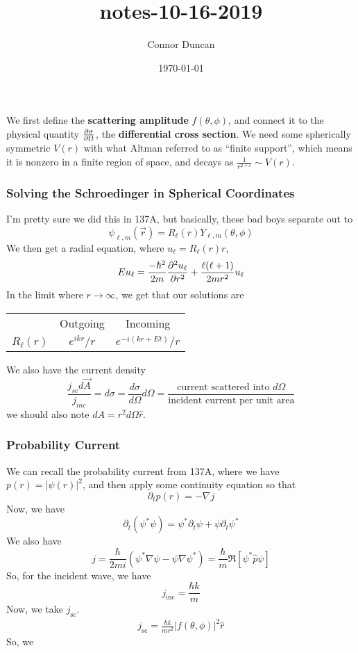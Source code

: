 \documentclass{article}
\author{Connor Duncan}
\date{\today}
\title{notes-10-16-2019}
\theoremstyle{definition}
\begin{document}
We first define the \textbf{scattering amplitude} $f(\theta,\phi)$, and connect it to the physical quantity $\pdv{\sigma}{\Omega}$, the \textbf{differential cross section}. We need some spherically symmetric $V(r)$ with what Altman referred to as ``finite support'', which means it is nonzero in a finite region of space, and decays as $\frac{1}{r^{2+\varepsilon}}\sim V(r)$. \subsubsection{Solving the Schroedinger in Spherical Coordinates} I'm pretty sure we did this in 137A, but basically, these bad boys separate out to \begin{equation} \psi_{\ell,m}(\vec{r})=R_{\ell}(r)Y_{\ell,m}(\theta,\phi) \end{equation} We then get a radial equation, where $u_\ell=R_\ell(r)r$, \begin{equation} Eu_\ell=\frac{-\hbar^2}{2m}\pdv[2]{u_\ell}{r}+\frac{\ell(\ell+1)}{2mr^2}u_\ell \end{equation} In the limit where $r\rightarrow\infty$, we get that our solutions are \begin{center} \begin{tabular}{ccc} & Outgoing & Incoming\\ $R_\ell(r)$ & $e^{ikr}/r$ & $e^{-i(kr+Et)}/r$ \end{tabular} \end{center} We also have the current density \begin{equation} \frac{j_{sc}d\vec{A}}{j_{inc}}=d\sigma=\frac{d\sigma}{d\Omega}d\Omega=\frac{\text{current scattered into }d\Omega}{\text{incident current per unit area}} \end{equation} we should also note $dA=r^2d\Omega\hat r$. \subsubsection{Probability Current} We can recall the probability current from 137A, where we have $p(r)=|\psi(r)|^2$, and then apply some continuity equation so that \begin{equation} \partial_tp(r)=-\nabla j \end{equation} Now, we have \begin{equation} \partial_t(\psi^*\psi)=\psi^*\partial_t\psi+\psi\partial_t\psi^* \end{equation} We also have \begin{equation} j=\frac{\hbar}{2mi}(\psi^*\nabla\psi-\psi\nabla\psi^*)=\frac{\hbar}{m}\Re[\psi^*\hat p\psi] \end{equation} So, for the incident wave, we have \begin{equation} j_{\mathrm{inc}}=\frac{\hbar k}{m} \end{equation} Now, we take $j_\mathrm{sc}$. \begin{align} j_\mathrm{sc}=\frac{\hbar k}{mr^2}|f(\theta,\phi)|^2\hat r \end{align} So, we 
\end{document}

